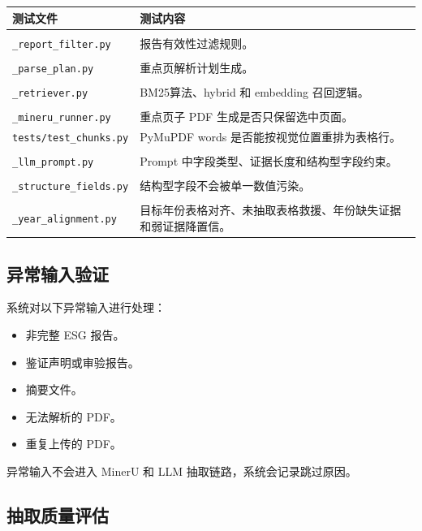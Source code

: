\documentclass[UTF8,a4paper,12pt]{ctexart}
\newenvironment{manualtable}[1]{%
  \small
  \begin{longtable}{#1}
}{%
  \end{longtable}
  \normalsize
}
\begin{document}
\begin{manualtable}{p{5cm}p{9cm}}
\toprule
\textbf{测试文件} & \textbf{测试内容} \\
\midrule
\endhead
\makecell[l]{\texttt{tests/test}\\\texttt{\_report\_filter.py}} & 报告有效性过滤规则。 \\
\makecell[l]{\texttt{tests/test}\\\texttt{\_parse\_plan.py}} & 重点页解析计划生成。 \\
\makecell[l]{\texttt{tests/test}\\\texttt{\_retriever.py}} & BM25算法、hybrid 和 embedding 召回逻辑。 \\
\makecell[l]{\texttt{tests/test}\\\texttt{\_mineru\_runner.py}} & 重点页子 PDF 生成是否只保留选中页面。 \\
\texttt{tests/test\_chunks.py} & PyMuPDF words 是否能按视觉位置重排为表格行。 \\
\makecell[l]{\texttt{tests/test}\\\texttt{\_llm\_prompt.py}} & Prompt 中字段类型、证据长度和结构型字段约束。 \\
\makecell[l]{\texttt{tests/test}\\\texttt{\_structure\_fields.py}} & 结构型字段不会被单一数值污染。 \\
\makecell[l]{\texttt{tests/test}\\\texttt{\_year\_alignment.py}} & 目标年份表格对齐、未抽取表格救援、年份缺失证据和弱证据降置信。 \\
\bottomrule
\end{manualtable}

\subsection{异常输入验证}

系统对以下异常输入进行处理：

\begin{itemize}
  \item 非完整 ESG 报告。
  \item 鉴证声明或审验报告。
  \item 摘要文件。
  \item 无法解析的 PDF。
  \item 重复上传的 PDF。
\end{itemize}

异常输入不会进入 MinerU 和 LLM 抽取链路，系统会记录跳过原因。

\subsection{抽取质量评估}
\end{document}
